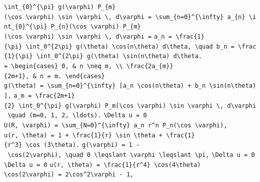 \documentclass[
  ukrainian,
]{article}
\begin{document}
\texttt{\textbackslash{}int\_\{0\}\^{}\{\textbackslash{}pi\}\ g(\textbackslash{}varphi)\ P\_\{m\}(\textbackslash{}cos\ \textbackslash{}varphi)\ \textbackslash{}sin\ \textbackslash{}varphi\ \textbackslash{},\ d\textbackslash{}varphi\ =\ \textbackslash{}sum\_\{n=0\}\^{}\{\textbackslash{}infty\}\ a\_\{n\}\ \textbackslash{}int\_\{0\}\^{}\{\textbackslash{}pi\}\ P\_\{n\}(\textbackslash{}cos\ \textbackslash{}varphi)\ P\_\{m\}(\textbackslash{}cos\ \textbackslash{}varphi)\ \textbackslash{}sin\ \textbackslash{}varphi\ \textbackslash{},\ d\textbackslash{}varphi\ =}
\texttt{a\_n\ =\ \textbackslash{}frac\{1\}\{\textbackslash{}pi\}\ \textbackslash{}int\_0\^{}\{2\textbackslash{}pi\}\ g(\textbackslash{}theta)\ \textbackslash{}cos(n\textbackslash{}theta)\ d\textbackslash{}theta,\ \textbackslash{}quad\ b\_n\ =\ \textbackslash{}frac\{1\}\{\textbackslash{}pi\}\ \textbackslash{}int\_0\^{}\{2\textbackslash{}pi\}\ g(\textbackslash{}theta)\ \textbackslash{}sin(n\textbackslash{}theta)\ d\textbackslash{}theta.}
\texttt{=\ \textbackslash{}begin\{cases\}\ 0,\ \&\ n\ \textbackslash{}neq\ m,\ \textbackslash{}\textbackslash{}\ \textbackslash{}frac\{2a\_\{m\}\}\{2m+1\},\ \&\ n\ =\ m.\ \textbackslash{}end\{cases\}}
\texttt{g(\textbackslash{}theta)\ =\ \textbackslash{}sum\_\{n=0\}\^{}\{\textbackslash{}infty\}\ {[}a\_n\ \textbackslash{}cos(n\textbackslash{}theta)\ +\ b\_n\ \textbackslash{}sin(n\textbackslash{}theta){]},}
\texttt{a\_m\ =\ \textbackslash{}frac\{2m+1\}\{2\}\ \textbackslash{}int\_0\^{}\{\textbackslash{}pi\}\ g(\textbackslash{}varphi)\ P\_m(\textbackslash{}cos\ \textbackslash{}varphi)\ \textbackslash{}sin\ \textbackslash{}varphi\ \textbackslash{},\ d\textbackslash{}varphi\ \textbackslash{}quad\ (m=0,\ 1,\ 2,\ \textbackslash{}ldots).}
\texttt{\textbackslash{}Delta\ u\ =\ 0}
\texttt{U(R,\ \textbackslash{}varphi)\ =\ \textbackslash{}sum\_\{N=0\}\^{}\{\textbackslash{}infty\}\ a\_n\ r\^{}n\ P\_n(\textbackslash{}cos\ \textbackslash{}varphi),}
\texttt{u(r,\ \textbackslash{}theta)\ =\ 1\ +\ \textbackslash{}frac\{1\}\{r\}\ \textbackslash{}sin\ \textbackslash{}theta\ +\ \textbackslash{}frac\{1\}\{r\^{}3\}\ \textbackslash{}cos\ (3\textbackslash{}theta).}
\texttt{g(\textbackslash{}varphi)\ =\ 1\ -\ \textbackslash{}cos(2\textbackslash{}varphi),\ \textbackslash{}quad\ 0\ \textbackslash{}leqslant\ \textbackslash{}varphi\ \textbackslash{}leqslant\ \textbackslash{}pi,}
\texttt{\textbackslash{}Delta\ u\ =\ 0}
\texttt{\textbackslash{}Delta\ u\ =\ 0}
\texttt{u(r,\ \textbackslash{}theta)\ =\ \textbackslash{}frac\{1\}\{r\^{}4\}\ \textbackslash{}cos(4\textbackslash{}theta)}
\texttt{\textbackslash{}cos(2\textbackslash{}varphi)\ =\ 2\textbackslash{}cos\^{}2\textbackslash{}varphi\ -\ 1,}
\end{document}
